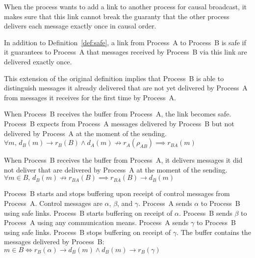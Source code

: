 When the process wants to add a link to another process for causal broadcast, it
makes sure that this link cannot break the guaranty that the other process
delivers each message exactly once in causal order.


\begin{definition}
  In addition to Definition~\ref{def:safe}, a link from Process~A to Process~B
  is safe if it guarantees to Process~A that messages received by Process~B via
  this link are delivered exactly once.
  
\end{definition}

This extension of the original definition implies that Process~B is able to
distinguish messages it already delivered that are not yet delivered by
Process~A from messages it receives for the first time by Process~A.

\begin{definition}
  When Process~B receives the buffer from Process~A, the link becomes safe.
  Process~B expects from Process~A messages delivered by Process~B but not
  delivered by Process~A at the moment of the sending.
  $\forall m,\, d_B(m) \rightarrow r_B(B)  \wedge d_A(m) \not\rightarrow r_A(\rho_{AB}) \implies r_{BA}(m)$
\end{definition}

\begin{definition}
  When Process~B receives the buffer from Process~A, it delivers messages it did
  not deliver that are delivered by Process~A at the moment of the sending.
  $\forall m \in B,\, d_B(m) \not\rightarrow r_{BA}(B) \implies r_{BA}(B) \rightarrow
  d_B(m)$
\end{definition}

\begin{definition}
  Process~B starts and stops buffering upon receipt of control messages from
  Process~A. Control messages are $\alpha$, $\beta$, and $\gamma$. Process~A
  sends $\alpha$ to Process~B using safe links. Process~B starts buffering on
  receipt of $\alpha$. Process~B sends $\beta$ to Process~A using any
  communication means. Process~A sends $\gamma$ to Process~B using safe
  links. Process~B stops buffering on receipt of $\gamma$.
  The buffer contains the messages delivered by Process~B: \\
  $m \in B \Longleftrightarrow 
  r_B(\alpha) \rightarrow d_B(m) \wedge d_B(m) \rightarrow r_B(\gamma)$
\end{definition}

